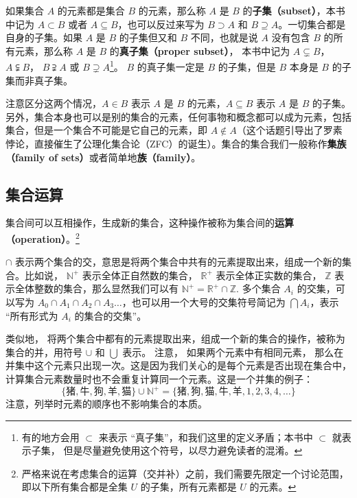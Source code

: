 如果集合 $A$ 的元素都是集合 $B$ 的元素，那么称 $A$ 是 $B$ 的\textbf{子集（subset）}，本书中记为 $A\subset B$ 或者 $A\subseteq B$，也可以反过来写为 $B\supset A$ 和 $B\supseteq A$。一切集合都是自身的子集。如果 $A$ 是 $B$ 的子集但又和 $B$ 不同，也就是说 $A$ 没有包含 $B$ 的所有元素，那么称 $A$ 是 $B$ 的\textbf{真子集（proper subset）}， 本书中记为 $A\subsetneq B$， $A\subsetneqq B$， $B\supsetneqq A$ 或 $B\supsetneq A$\footnote{有的地方会用 $\subset$ 来表示 “真子集”，和我们这里的定义矛盾；本书中 $\subset$ 就表示子集， 但是尽量避免使用这个符号，以尽力避免读者的混淆。}。 $B$ 的真子集一定是 $B$ 的子集，但是 $B$ 本身是 $B$ 的子集而非真子集。

注意区分这两个情况，$A \in B$ 表示 $A$ 是 $B$ 的元素，$A \subseteq B$ 表示 $A$ 是 $B$ 的子集。另外，集合本身也可以是别的集合的元素，任何事物和概念都可以成为元素，包括集合，但是一个集合不可能是它自己的元素，即 $A \not\in A$（这个话题引导出了罗素悖论，直接催生了公理化集合论（ZFC）的诞生）。集合的集合我们一般称作\textbf{集族（family of sets）}或者简单地\textbf{族（family）}。

\subsection{集合运算}\label{sub_Set_1}

集合间可以互相操作，生成新的集合，这种操作被称为集合间的\textbf{运算（operation）}。\footnote{严格来说在考虑集合的运算（交并补）之前，我们需要先限定一个讨论范围，即以下所有集合都是全集 $U$ 的子集，所有元素都是 $U$ 的元素。}

$\cap$ 表示两个集合的交，意思是将两个集合中共有的元素提取出来，组成一个新的集合。比如说， $\mathbb{N^+}$ 表示全体正自然数的集合， $\mathbb{R^+}$ 表示全体正实数的集合， $\mathbb{Z}$ 表示全体整数的集合，那么显然我们可以有 $\mathbb{N^+}=\mathbb{R^+}\cap\mathbb{Z}$. 多个集合 $A_i$ 的交集，可以写为 $A_0\cap A_1\cap A_2\cap A_3\dots$，也可以用一个大号的交集符号简记为 $\bigcap A_i$，表示 “所有形式为 $A_i$ 的集合的交集”。

类似地， 将两个集合中都有的元素提取出来，组成一个新的集合的操作，被称为集合的并，用符号 $\cup$ 和 $\bigcup$ 表示。 注意， 如果两个元素中有相同元素， 那么在并集中这个元素只出现一次。这是因为我们关心的是每个元素是否出现在集合中，计算集合元素数量时也不会重复计算同一个元素。这是一个并集的例子：
\begin{equation}
\{\text{猪}, \text{牛}, \text{狗}, \text{羊}, \text{猫}\}\cup\mathbb{N^+}=\{\text{猪}, \text{狗}, \text{猫}, \text{牛}, \text{羊}, 1, 2,3,4,\dots\}
\end{equation}
注意，列举时元素的顺序也不影响集合的本质。

